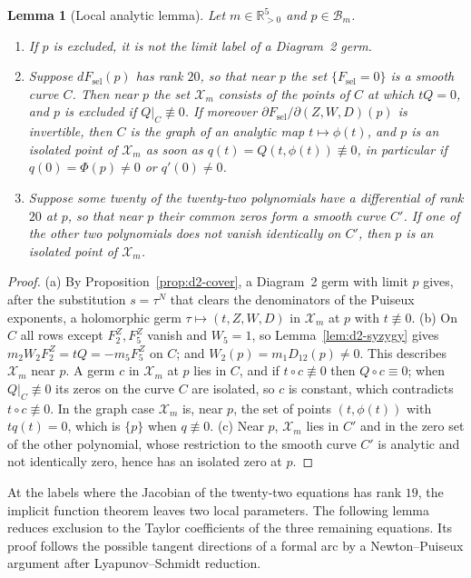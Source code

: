 \documentclass[11pt]{amsart}
\newenvironment{alphalist}{\begin{enumerate}\renewcommand{\labelenumi}{(\alph{enumi})}%
  \renewcommand{\theenumi}{\alph{enumi}}}{\end{enumerate}}
\newtheorem{lemma}[theorem]{Lemma}
\theoremstyle{definition}
\theoremstyle{remark}
\newcommand{\Rp}{\mathbb{R}_{>0}}
\begin{document}
\begin{lemma}[Local analytic lemma]\label{lem:d2-isolation}
Let $m\in\Rp^5$ and $p\in\mathcal B_m$.
\begin{alphalist}
  \item If $p$ is excluded, it is not the limit label of a Diagram~2 germ.
  \item Suppose $dF_{\mathrm{sel}}(p)$ has rank $20$, so that near $p$ the set
  $\{F_{\mathrm{sel}}=0\}$ is a smooth curve $C$.  Then near $p$ the set $\mathcal X_m$ consists of the
  points of $C$ at which $tQ=0$, and $p$ is excluded if $Q|_C\not\equiv0$.  If moreover
  $\partial F_{\mathrm{sel}}/\partial(Z,W,D)(p)$ is invertible, then $C$ is the graph of an
  analytic map $t\mapsto\phi(t)$, and $p$ is an isolated point of $\mathcal X_m$ as soon as
  $q(t)=Q(t,\phi(t))\not\equiv0$, in particular if $q(0)=\Phi(p)\ne0$ or $q'(0)\ne0$.
  \item Suppose some twenty of the twenty-two polynomials have a differential of rank $20$ at
  $p$, so that near $p$ their common zeros form a smooth curve $C'$.  If one of the other two
  polynomials does not vanish identically on $C'$, then $p$ is an isolated point of $\mathcal X_m$.
\end{alphalist}
\end{lemma}

\begin{proof}
(a) By Proposition~\ref{prop:d2-cover}, a Diagram~2 germ with limit $p$ gives, after the
substitution $s=\tau^N$ that clears the denominators of the Puiseux exponents, a holomorphic germ
$\tau\mapsto(t,Z,W,D)$ in $\mathcal X_m$ at $p$ with $t\not\equiv0$.
(b) On $C$ all rows except $F^Z_2,F^Z_5$ vanish and $W_5=1$, so Lemma~\ref{lem:d2-syzygy} gives
$m_2W_2F^Z_2=tQ=-m_5F^Z_5$ on $C$; and $W_2(p)=m_1D_{12}(p)\ne0$.  This describes $\mathcal X_m$
near $p$.  A germ $c$ in $\mathcal X_m$ at $p$ lies in $C$, and if $t\circ c\not\equiv0$ then
$Q\circ c\equiv0$; when
$Q|_C\not\equiv0$ its zeros on the curve $C$ are isolated, so $c$ is constant, which contradicts
$t\circ c\not\equiv0$.  In the graph case $\mathcal X_m$ is, near $p$, the set of points $(t,\phi(t))$ with
$tq(t)=0$, which is $\{p\}$ when $q\not\equiv0$.
(c) Near $p$, $\mathcal X_m$ lies in $C'$ and in the zero set of the other polynomial, whose restriction
to the smooth curve $C'$ is analytic and not identically zero, hence has an isolated zero at $p$.
\end{proof}

{At the labels where the Jacobian of the twenty-two equations has rank
$19$, the implicit function theorem leaves two local parameters.  The following lemma
reduces exclusion to the Taylor coefficients of the three remaining equations.
Its proof follows the possible tangent directions of a formal arc by a Newton--Puiseux
argument after Lyapunov--Schmidt reduction.}
\end{document}
